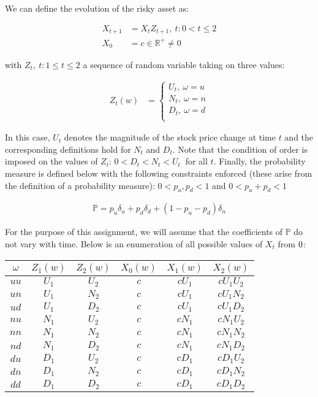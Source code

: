 \documentclass{article}
\begin{document}
We can define the evolution of the risky asset as:

\begin{align*}
    X_{t+1} &= X_tZ_{t+1},\medspace t:0< t\le 2\\
    X_0 & = c\in\mathbb{R}^+\neq0
\end{align*}

with $Z_t,\medspace t:1\le t\le 2$ a sequence of random variable taking on three values:

\begin{align*}
Z_t(w) &= \begin{cases}
    U_t, \medspace \omega=u \\
    N_t, \medspace \omega=n \\
    D_t, \medspace \omega=d \\
\end{cases}
\end{align*}

In this case, $U_t$ denotes the magnitude of the stock price change at time $t$ and the corresponding definitions hold for $N_t$ and $D_t$. Note that the condition of order is imposed on the values of $Z_t$: $0<D_t<N_t<U_t\medspace$ for all $t$. Finally, the probability measure is defined below with the following constraints enforced (these arise from the definition of a probability measure): $0<p_u,p_d<1$ and $0<p_u+p_d<1$

\begin{align*}
    \mathbb{P} = p_u\delta_u + p_d\delta_d + (1-p_u-p_d)\delta_n
\end{align*}

For the purpose of this assignment, we will assume that the coefficients of $\mathbb{P}$ do not vary with time. Below is an enumeration of all possible values of $X_t$ from $0\let\le2$:

\begin{center}
\begin{tabular}{|c|c|c|c|c|c|}
\hline
$\omega$ & $Z_1(w)$ & $Z_2(w)$ & $X_0(w)$ & $X_1(w)$ & $X_2(w)$ \\
\hline
\hline
$uu$ & $U_1$ & $U_2$ & $c$ & $cU_1$ & $cU_1U_2$ \\\hline
$un$ & $U_1$ & $N_2$ & $c$ & $cU_1$ & $cU_1N_2$ \\\hline
$ud$ & $U_1$ & $D_2$ & $c$ & $cU_1$ & $cU_1D_2$ \\\hline
$nu$ & $N_1$ & $U_2$ & $c$ & $cN_1$ & $cN_1U_2$ \\\hline
$nn$ & $N_1$ & $N_2$ & $c$ & $cN_1$ & $cN_1N_2$ \\\hline
$nd$ & $N_1$ & $D_2$ & $c$ & $cN_1$ & $cN_1D_2$ \\\hline
$du$ & $D_1$ & $U_2$ & $c$ & $cD_1$ & $cD_1U_2$ \\\hline
$dn$ & $D_1$ & $N_2$ & $c$ & $cD_1$ & $cD_1N_2$ \\\hline
$dd$ & $D_1$ & $D_2$ & $c$ & $cD_1$ & $cD_1D_2$ \\\hline
\end{tabular}
\end{center}
\end{document}
